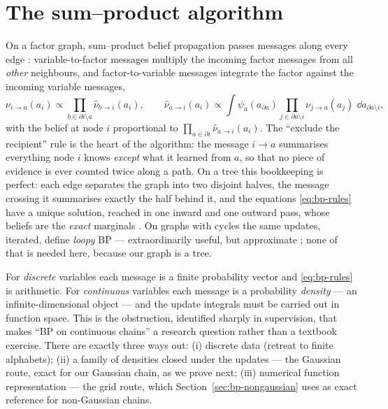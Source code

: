 \section{The sum--product algorithm}\label{sec:bp-chain}

On a factor graph, sum--product belief propagation passes messages along
every edge \citep{pearl1988probabilistic, kschischang2001factor,
mezard2009information}: variable-to-factor messages multiply the incoming
factor messages from all \emph{other} neighbours, and factor-to-variable
messages integrate the factor against the incoming variable messages,
\begin{equation}
  \nu_{i \to a}(a_i) \propto
    \prod_{b \in \partial i \setminus a} \hat\nu_{b \to i}(a_i),
  \qquad
  \hat\nu_{a \to i}(a_i) \propto
    \int \psi_a(a_{\partial a})
    \prod_{j \in \partial a \setminus i} \nu_{j \to a}(a_j)\;
    \dd a_{\partial a \setminus i},
  \label{eq:bp-rules}
\end{equation}
with the belief at node $i$ proportional to
$\prod_{a \in \partial i} \hat\nu_{a \to i}(a_i)$. The ``exclude the
recipient'' rule is the heart of the algorithm: the message $i \to a$
summarises everything node $i$ knows \emph{except} what it learned from
$a$, so that no piece of evidence is ever counted twice along a path. On a
tree this bookkeeping is perfect: each edge separates the graph into two
disjoint halves, the message crossing it summarises exactly the half
behind it, and the equations \eqref{eq:bp-rules} have a unique solution,
reached in one inward and one outward pass, whose beliefs are the
\emph{exact} marginals \citep[Theorem~14.1]{mezard2009information}. On
graphs with cycles the same updates, iterated, define \emph{loopy} BP ---
extraordinarily useful, but approximate \citep{weiss2001correctness,
malioutov2006walk}; none of that is needed here, because our graph is a
tree.

For \emph{discrete} variables each message is a finite probability vector
and \eqref{eq:bp-rules} is arithmetic. For \emph{continuous} variables
each message is a probability \emph{density} --- an infinite-dimensional
object --- and the update integrals must be carried out in function space.
This is the obstruction, identified sharply in supervision, that makes
``BP on continuous chains'' a research question rather than a textbook
exercise. There are exactly three ways out: (i) discrete data (retreat to
finite alphabets); (ii) a family of densities closed under the updates ---
the Gaussian route, exact for our Gaussian chain, as we prove next;
(iii) numerical function representation --- the grid route, which
Section~\ref{sec:bp-nongaussian} uses as exact reference for non-Gaussian
chains.

